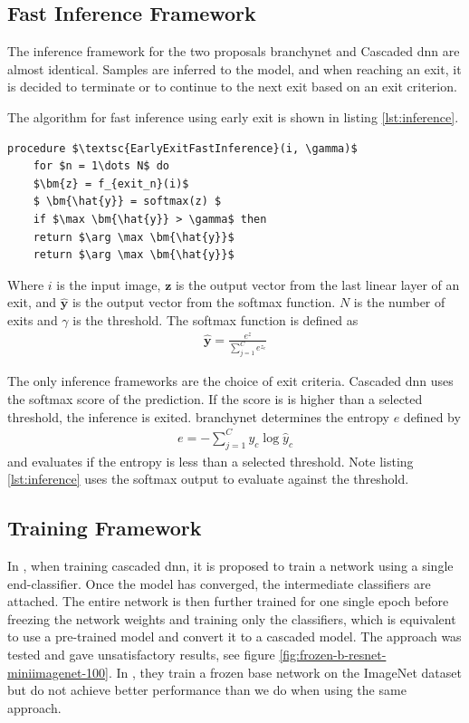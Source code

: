 \subsection{Fast Inference Framework} 

The inference framework for the two proposals \gls{branchynet} and Cascaded \gls{dnn} are almost identical. Samples are inferred to the model, and when reaching an exit, it is decided to terminate or to continue to the next exit based on an exit criterion. 

The algorithm for fast inference using early exit is shown in listing \ref{lst:inference}. 

\begin{minipage}{\linewidth}
	\begin{lstlisting}[language = {}, mathescape=true, caption={Early Exit Fast Inference }, label={lst:inference}]
	procedure $\textsc{EarlyExitFastInference}(i, \gamma)$
	for $n = 1\dots N$ do
	$\bm{z} = f_{exit_n}(i)$
	$ \bm{\hat{y}} = softmax(z) $
	if $\max \bm{\hat{y}} > \gamma$ then
	return $\arg \max \bm{\hat{y}}$
	return $\arg \max \bm{\hat{y}}$ 
	\end{lstlisting}
\end{minipage}

Where $ i $ is the input image, $ \bm{z} $ is the output vector from the last linear layer of an exit, and $ \bm{\hat{y}} $ is the output vector from the softmax function. $ N $ is the number of exits and $ \gamma $ is the threshold. The softmax function is defined as
\begin{align}
\bm{\hat{y}} = \frac{e^{z}}{\sum_{j=1}^{C}e^{z_c}}
\end{align}

The only inference frameworks are the choice of exit criteria. Cascaded \gls{dnn} uses the softmax score of the prediction. If the score is is higher than a selected threshold, the inference is exited. \gls{branchynet} determines the entropy $ e $ defined by
\begin{align}
e = -\sum_{j=1}^{C} y_c \log \hat{y}_c
\end{align}
and evaluates if the entropy is less than a selected threshold. Note listing \ref{lst:inference} uses the softmax output to evaluate against the threshold.

\subsection{Training Framework} 

In \cite{leroux_resource-constrained_2015}, when training cascaded \gls{dnn}, it is proposed to train a network using a single end-classifier. Once the model has converged, the intermediate classifiers are attached. The entire network is then further trained for one single epoch before freezing the network weights and training only the classifiers, which is equivalent to use a pre-trained model and convert it to a cascaded model. The approach was tested and gave unsatisfactory results, see figure \ref{fig:frozen-b-resnet-miniimagenet-100}. In \cite{leroux_cascading_2017}, they train a frozen base network on the ImageNet dataset but do not achieve better performance than we do when using the same approach.  

